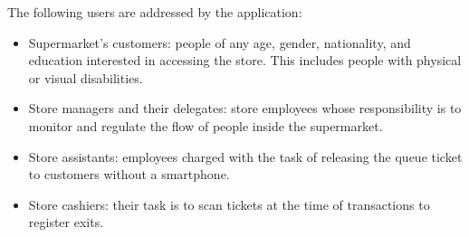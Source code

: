 \documentclass[../../main.tex]{subfiles}
\begin{document}
	The following users are addressed by the application:
	\begin{itemize}
		\item Supermarket's customers: people of any age, gender, nationality, and education interested in accessing the store. This includes people with physical or visual disabilities.
		\item Store managers and their delegates: store employees whose responsibility is to monitor and regulate the flow of people inside the supermarket.
		\item Store assistants: employees charged with the task of releasing the queue ticket to customers without a smartphone.
		\item Store cashiers: their task is to scan tickets at the time of transactions to register exits.
	\end{itemize}
\end{document}
